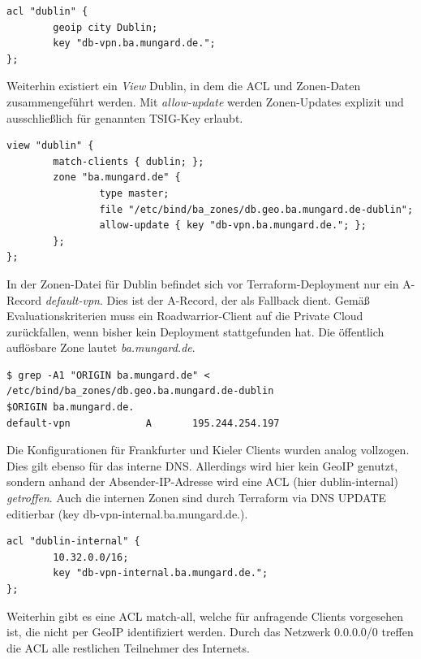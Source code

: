 \begin{lstlisting}[label=acl-geoip-bind,caption=.]
acl "dublin" {
        geoip city Dublin;
        key "db-vpn.ba.mungard.de.";
};
\end{lstlisting}

Weiterhin existiert ein \textit{View} \glqq Dublin\grqq{}, in dem die ACL und Zonen-Daten zusammengeführt werden. Mit \textit{allow-update} werden Zonen-Updates explizit und ausschließlich für genannten TSIG-Key erlaubt.

\begin{lstlisting}[label=view-geoip-bind,caption=.]
view "dublin" {
        match-clients { dublin; };
        zone "ba.mungard.de" {
                type master;
                file "/etc/bind/ba_zones/db.geo.ba.mungard.de-dublin";
                allow-update { key "db-vpn.ba.mungard.de."; };
        };
};
\end{lstlisting}

In der Zonen-Datei für Dublin befindet sich vor Terraform-Deployment nur ein A-Record \textit{default-vpn}. Dies ist der A-Record, der als Fallback dient. Gemäß Evaluationskriterien muss ein Roadwarrior-Client auf die Private Cloud zurückfallen, wenn bisher kein Deployment stattgefunden hat. Die öffentlich auflösbare Zone lautet \textit{ba.mungard.de}.

\begin{lstlisting}[label=zone-dublin-before-deployment,caption=Die Zone ba.mungard.de vor dem Terraform-Deployment.]
$ grep -A1 "ORIGIN ba.mungard.de" < /etc/bind/ba_zones/db.geo.ba.mungard.de-dublin
$ORIGIN ba.mungard.de.
default-vpn             A       195.244.254.197
\end{lstlisting}

Die Konfigurationen für Frankfurter und Kieler Clients wurden analog vollzogen. Dies gilt ebenso für das interne DNS. Allerdings wird hier kein GeoIP genutzt, sondern anhand der Absender-IP-Adresse wird eine ACL (hier \glqq dublin-internal\grqq{}) \textit{getroffen}. Auch die internen Zonen sind durch Terraform via DNS UPDATE editierbar (key \glqq db-vpn-internal.ba.mungard.de.\grqq{}).

\begin{lstlisting}[label=view-internal-bind,caption=Absender-IPs aus dem Netzwerk 10.32.0.0/16 treffen die ACL dublin-internal.]
acl "dublin-internal" {
        10.32.0.0/16;
        key "db-vpn-internal.ba.mungard.de.";
};
\end{lstlisting}

Weiterhin gibt es eine ACL \glqq match-all\grqq{}, welche für anfragende Clients vorgesehen ist, die nicht per GeoIP identifiziert werden. Durch das Netzwerk 0.0.0.0/0 treffen die ACL alle restlichen Teilnehmer des Internets.

